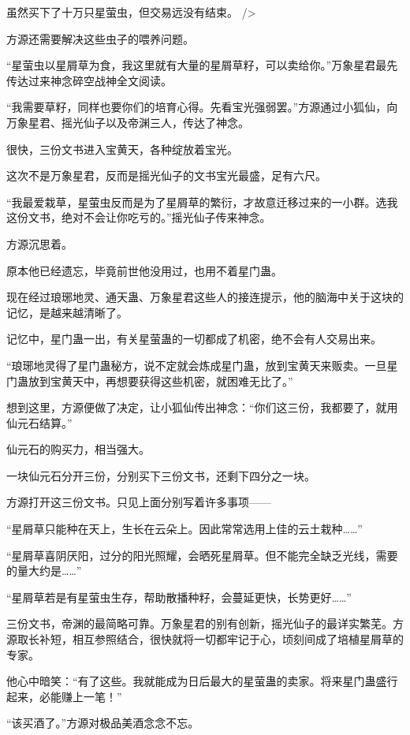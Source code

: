
\begin{this_body}

虽然买下了十万只星萤虫，但交易远没有结束。 />

方源还需要解决这些虫子的喂养问题。

“星萤虫以星屑草为食，我这里就有大量的星屑草籽，可以卖给你。”万象星君最先传达过来神念碎空战神全文阅读。

“我需要草籽，同样也要你们的培育心得。先看宝光强弱罢。”方源通过小狐仙，向万象星君、摇光仙子以及帝渊三人，传达了神念。

很快，三份文书进入宝黄天，各种绽放着宝光。

这次不是万象星君，反而是摇光仙子的文书宝光最盛，足有六尺。

“我最爱栽草，星萤虫反而是为了星屑草的繁衍，才故意迁移过来的一小群。选我这份文书，绝对不会让你吃亏的。”摇光仙子传来神念。

方源沉思着。

原本他已经遗忘，毕竟前世他没用过，也用不着星门蛊。

现在经过琅琊地灵、通天蛊、万象星君这些人的接连提示，他的脑海中关于这块的记忆，是越来越清晰了。

记忆中，星门蛊一出，有关星萤蛊的一切都成了机密，绝不会有人交易出来。

“琅琊地灵得了星门蛊秘方，说不定就会炼成星门蛊，放到宝黄天来贩卖。一旦星门蛊放到宝黄天中，再想要获得这些机密，就困难无比了。”

想到这里，方源便做了决定，让小狐仙传出神念：“你们这三份，我都要了，就用仙元石结算。”

仙元石的购买力，相当强大。

一块仙元石分开三份，分别买下三份文书，还剩下四分之一块。

方源打开这三份文书。只见上面分别写着许多事项——

“星屑草只能种在天上，生长在云朵上。因此常常选用上佳的云土栽种……”

“星屑草喜阴厌阳，过分的阳光照耀，会晒死星屑草。但不能完全缺乏光线，需要的量大约是……”

“星屑草若是有星萤虫生存，帮助散播种籽，会蔓延更快，长势更好……”

三份文书，帝渊的最简略可靠。万象星君的别有创新，摇光仙子的最详实繁芜。方源取长补短，相互参照结合，很快就将一切都牢记于心，顷刻间成了培植星屑草的专家。

他心中暗笑：“有了这些。我就能成为日后最大的星萤蛊的卖家。将来星门蛊盛行起来，必能赚上一笔！”

“该买酒了。”方源对极品美酒念念不忘。


\end{this_body}
